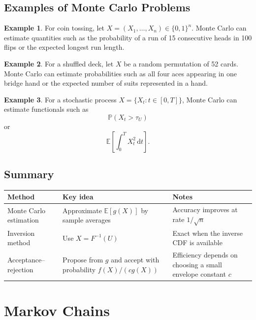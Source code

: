 \documentclass[12pt,oneside]{book}
\numberwithin{equation}{section}
\theoremstyle{definition}
\newtheorem{example}{Example}[section]
\theoremstyle{plain}
\theoremstyle{remark}
\newcommand{\E}{\mathbb{E}}
\newcommand{\Prob}{\mathbb{P}}
\newcommand{\dd}{\,\mathrm{d}}
\begin{document}
\section{Examples of Monte Carlo Problems}

\begin{example}
For coin tossing, let $X=(X_1,\ldots,X_n)\in\{0,1\}^n$. Monte Carlo can estimate quantities such as the probability of a run of 15 consecutive heads in 100 flips or the expected longest run length.
\end{example}

\begin{example}
For a shuffled deck, let $X$ be a random permutation of 52 cards. Monte Carlo can estimate probabilities such as all four aces appearing in one bridge hand or the expected number of suits represented in a hand.
\end{example}

\begin{example}
For a stochastic process $X=\{X_t:t\in[0,T]\}$, Monte Carlo can estimate functionals such as
\[
\Prob(X_t>\tau_U)
\]
or
\[
\E\left[\int_0^T X_t^2\dd t\right].
\]
\end{example}

\section{Summary}

\begin{center}
\begin{xltabular}{\textwidth}{>{\raggedright\arraybackslash}p{0.25\textwidth}
>{\raggedright\arraybackslash}p{0.30\textwidth}
>{\raggedright\arraybackslash}X}
\toprule
Method & Key idea & Notes \\
\midrule
Monte Carlo estimation
& Approximate $\E[g(X)]$ by sample averages
& Accuracy improves at rate $1/\sqrt{n}$ \\

Inversion method
& Use $X=F^{-1}(U)$
& Exact when the inverse CDF is available \\

Acceptance--rejection
& Propose from $g$ and accept with probability $f(X)/(cg(X))$
& Efficiency depends on choosing a small envelope constant $c$ \\
\bottomrule
\end{xltabular}
\end{center}

\chapter{Markov Chains}
\end{document}
